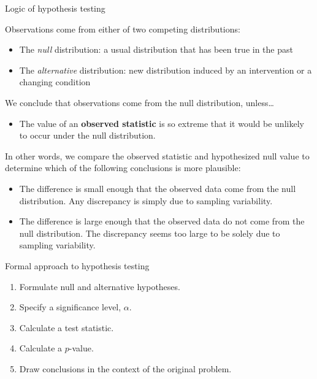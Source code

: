 \documentclass[
  ignorenonframetext,
  aspectratio=169]{beamer}
\providecommand{\tightlist}{%
  \setlength{\itemsep}{0pt}\setlength{\parskip}{0pt}}
\begin{document}
\begin{frame}{Logic of hypothesis testing}
\protect\hypertarget{logic-of-hypothesis-testing}{}
\small

Observations come from either of two competing distributions:

\begin{itemize}
\item
  The \emph{null} distribution: a usual distribution that has been true
  in the past
\item
  The \emph{alternative} distribution: new distribution induced by an
  intervention or a changing condition
\end{itemize}

We conclude that observations come from the null distribution,
unless\ldots{}

\begin{itemize}
\tightlist
\item
  The value of an \textbf{observed statistic} is so extreme that it
  would be unlikely to occur under the null distribution.
\end{itemize}

In other words, we compare the observed statistic and hypothesized null
value to determine which of the following conclusions is more plausible:

\begin{itemize}
\item
  The difference is small enough that the observed data come from the
  null distribution. Any discrepancy is simply due to sampling
  variability.
\item
  The difference is large enough that the observed data do not come from
  the null distribution. The discrepancy seems too large to be solely
  due to sampling variability.
\end{itemize}
\end{frame}

\begin{frame}{Formal approach to hypothesis testing}
\protect\hypertarget{formal-approach-to-hypothesis-testing}{}
\begin{enumerate}
\item
  Formulate null and alternative hypotheses.
\item
  Specify a significance level, \(\alpha\).
\item
  Calculate a test statistic.
\item
  Calculate a \(p\)-value.
\item
  Draw conclusions in the context of the original problem.
\end{enumerate}
\end{frame}
\end{document}
